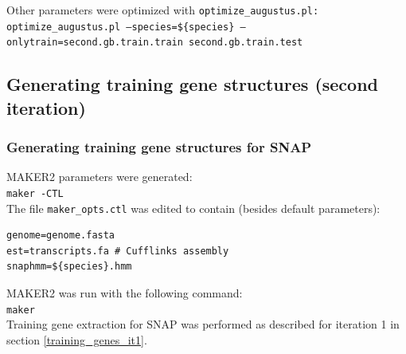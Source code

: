\documentclass[a4paper,10pt]{report}
\begin{document}


\noindent Other parameters were optimized with \texttt{optimize\_augustus.pl:}\\

\noindent \texttt{optimize\_augustus.pl --species=\$\{species\} --onlytrain=second.gb.train.train second.gb.train.test}\\



\subsection{Generating training gene structures (second iteration)}

\subsubsection{Generating training gene structures for SNAP}

MAKER2 parameters were generated:\\

\noindent \texttt{maker -CTL}\\

\noindent The file \texttt{maker\_opts.ctl} was edited to contain (besides default parameters):

\begin{verbatim}
genome=genome.fasta
est=transcripts.fa # Cufflinks assembly
snaphmm=${species}.hmm
\end{verbatim}

\noindent MAKER2 was run with the following command:\\

\noindent \texttt{maker}\\

\noindent Training gene extraction for SNAP was performed as described for iteration 1 in section \ref{training_genes_it1}.
\end{document}
